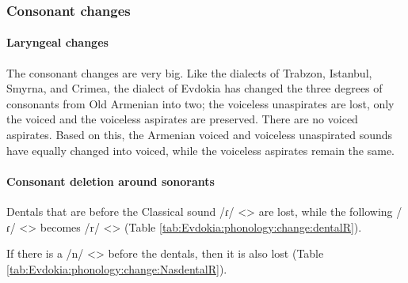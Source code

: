 \subsubsection{Consonant changes}

\paragraph{Laryngeal changes}

The consonant changes are very big. Like the dialects of Trabzon, Istanbul, Smyrna, and Crimea, the dialect of Evdokia has changed the three degrees of consonants from Old Armenian into two; the voiceless unaspirates are lost, only the voiced and the voiceless aspirates are preserved. There are no voiced aspirates. Based on this, the Armenian voiced and voiceless unaspirated sounds have equally changed into voiced, while the voiceless aspirates remain the same. 

\paragraph{Consonant deletion around sonorants} 


Dentals that are before the Classical sound /ɾ/ <> are lost, while the following /ɾ/ <> becomes /r/ <> (Table \ref{tab:Evdokia:phonology:change:dentalR}). 



\begin{table}[H]
	\centering 
	\caption{Loss of dentals before Classical Armenian /ɾ/ <> and subsequent trilling in the Evdokia dialect}
	\label{tab:Evdokia:phonology:change:dentalR}
\end{table}


If there is a /n/ <> before the dentals, then it is also lost (Table \ref{tab:Evdokia:phonology:change:NasdentalR}). 



